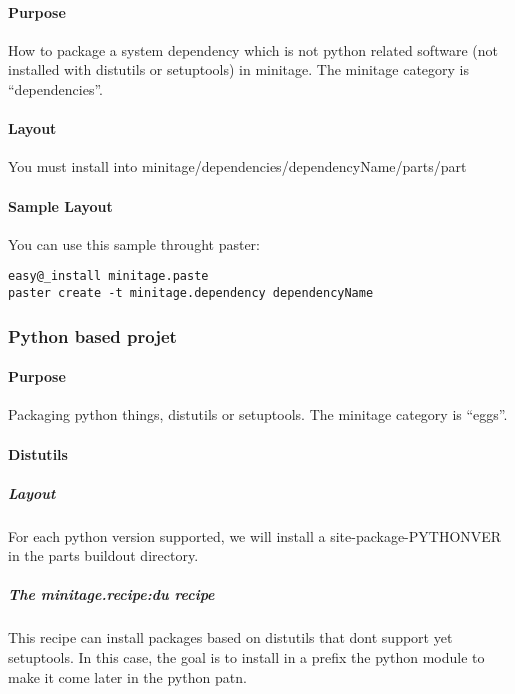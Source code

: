 \documentclass[letterpaper,10pt,english]{sphinxmanual}
\begin{document}
\paragraph{Purpose}
\label{paster/projects/packaging_projects:purpose}
How to package a system dependency which is not python related software (not installed with distutils or setuptools) in minitage.
The minitage category is ``dependencies''.


\paragraph{Layout}
\label{paster/projects/packaging_projects:layout}
You must install into minitage/dependencies/dependencyName/parts/part


\paragraph{Sample Layout}
\label{paster/projects/packaging_projects:sample-layout}
You can use this sample throught paster:

\begin{Verbatim}[commandchars=@\[\]]
easy@_install minitage.paste
paster create -t minitage.dependency dependencyName
\end{Verbatim}


\subsubsection{Python based projet}
\label{paster/projects/packaging_projects:eggproject}\label{paster/projects/packaging_projects:python-based-projet}

\paragraph{Purpose}
\label{paster/projects/packaging_projects:id1}
Packaging python things, distutils or setuptools.
The minitage category is ``eggs''.


\paragraph{Distutils}
\label{paster/projects/packaging_projects:distutils}

\subparagraph{Layout}
\label{paster/projects/packaging_projects:id2}
For each python version supported, we will install a site-package-PYTHONVER in the parts buildout directory.


\subparagraph{The minitage.recipe:du recipe}
\label{paster/projects/packaging_projects:the-minitage-recipe-du-recipe}
This recipe can install packages based on distutils that dont support yet setuptools.
In this case, the goal is to install in a prefix the python module to make it
come later in the python patn.
\end{document}
